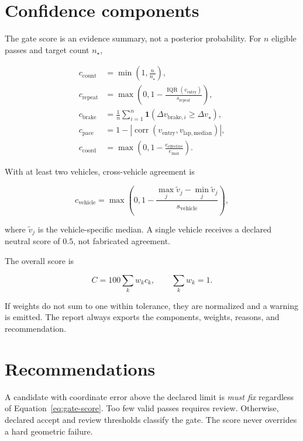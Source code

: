 \documentclass[11pt,oneside]{report}
\begin{document}
\section{Confidence components}

The gate score is an evidence summary, not a posterior probability.  For $n$ eligible
passes and target count $n_{\star}$,

\begin{align}
c_{\mathrm{count}} &= \min\left(1,\frac{n}{n_{\star}}\right),\\
c_{\mathrm{repeat}} &= \max\left(0,1-\frac{\operatorname{IQR}(v_{\mathrm{entry}})}
                                            {s_{\mathrm{repeat}}}\right),\\
c_{\mathrm{brake}} &= \frac{1}{n}\sum_{i=1}^{n}
   \mathbf{1}\!\left(\Delta v_{\mathrm{brake},i}\geq \Delta v_{\star}\right),\\
c_{\mathrm{pace}} &= 1-\left|\operatorname{corr}
   (v_{\mathrm{entry}},v_{\mathrm{lap,median}})\right|,\\
c_{\mathrm{coord}} &= \max\left(0,1-\frac{e_{\mathrm{effective}}}{e_{\max}}\right).
\end{align}

With at least two vehicles, cross-vehicle agreement is

\begin{equation}
c_{\mathrm{vehicle}}=\max\left(0,1-
\frac{\max_j \widetilde v_j-\min_j \widetilde v_j}{s_{\mathrm{vehicle}}}\right),
\end{equation}

where $\widetilde v_j$ is the vehicle-specific median.  A single vehicle receives a
declared neutral score of $0.5$, not fabricated agreement.

The overall score is

\begin{equation}
C=100\sum_k w_k c_k, \qquad \sum_k w_k=1.
\label{eq:gate-score}
\end{equation}

If weights do not sum to one within tolerance, they are normalized and a warning is
emitted.  The report always exports the components, weights, reasons, and recommendation.

\section{Recommendations}

A candidate with coordinate error above the declared limit is \emph{must fix} regardless
of Equation~\eqref{eq:gate-score}.  Too few valid passes requires review.  Otherwise,
declared accept and review thresholds classify the gate.  The score never overrides a
hard geometric failure.
\end{document}
